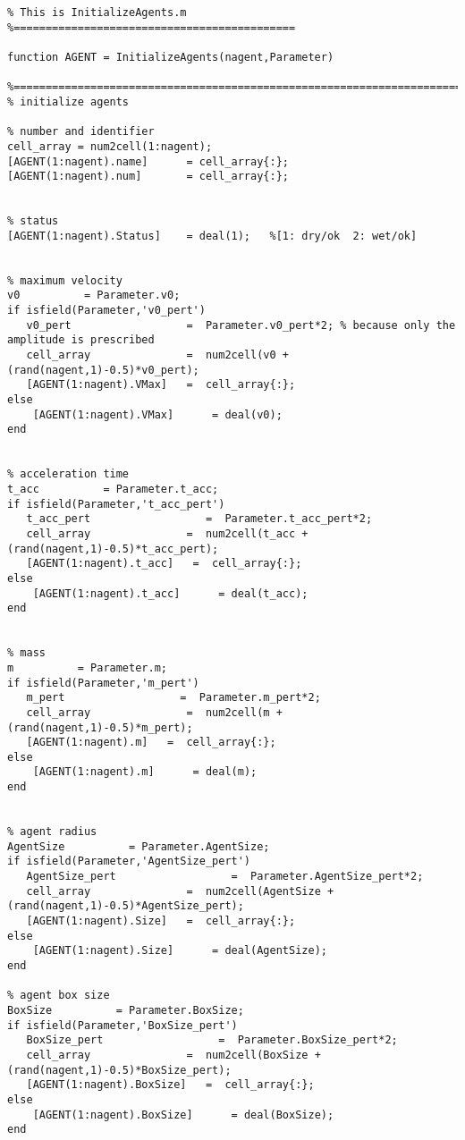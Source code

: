 
\lstset{basicstyle=\footnotesize\ttfamily}
    
    \begin{lstlisting}[breaklines]
%============================================
% This is InitializeAgents.m
%============================================

function AGENT = InitializeAgents(nagent,Parameter)

%==========================================================================
% initialize agents

% number and identifier
cell_array = num2cell(1:nagent);
[AGENT(1:nagent).name]      = cell_array{:};
[AGENT(1:nagent).num]       = cell_array{:};


% status
[AGENT(1:nagent).Status] 	= deal(1);   %[1: dry/ok  2: wet/ok]


% maximum velocity
v0          = Parameter.v0;
if isfield(Parameter,'v0_pert')
   v0_pert                  =  Parameter.v0_pert*2; % because only the amplitude is prescribed
   cell_array               =  num2cell(v0 + (rand(nagent,1)-0.5)*v0_pert);
   [AGENT(1:nagent).VMax]   =  cell_array{:};
else
    [AGENT(1:nagent).VMax]      = deal(v0);
end


% acceleration time
t_acc          = Parameter.t_acc;
if isfield(Parameter,'t_acc_pert')
   t_acc_pert                  =  Parameter.t_acc_pert*2;
   cell_array               =  num2cell(t_acc + (rand(nagent,1)-0.5)*t_acc_pert);
   [AGENT(1:nagent).t_acc]   =  cell_array{:};
else
    [AGENT(1:nagent).t_acc]      = deal(t_acc);
end


% mass
m          = Parameter.m;
if isfield(Parameter,'m_pert')
   m_pert                  =  Parameter.m_pert*2;
   cell_array               =  num2cell(m + (rand(nagent,1)-0.5)*m_pert);
   [AGENT(1:nagent).m]   =  cell_array{:};
else
    [AGENT(1:nagent).m]      = deal(m);
end


% agent radius
AgentSize          = Parameter.AgentSize;
if isfield(Parameter,'AgentSize_pert')
   AgentSize_pert                  =  Parameter.AgentSize_pert*2;
   cell_array               =  num2cell(AgentSize + (rand(nagent,1)-0.5)*AgentSize_pert);
   [AGENT(1:nagent).Size]   =  cell_array{:};
else
    [AGENT(1:nagent).Size]      = deal(AgentSize);
end

% agent box size
BoxSize          = Parameter.BoxSize;
if isfield(Parameter,'BoxSize_pert')
   BoxSize_pert                  =  Parameter.BoxSize_pert*2;
   cell_array               =  num2cell(BoxSize + (rand(nagent,1)-0.5)*BoxSize_pert);
   [AGENT(1:nagent).BoxSize]   =  cell_array{:};
else
    [AGENT(1:nagent).BoxSize]      = deal(BoxSize);
end



\end{lstlisting}
